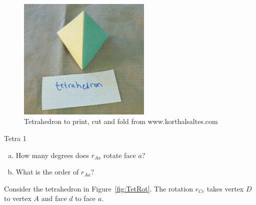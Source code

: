 \begin{figure}[ht]
\begin{center}
\includegraphics[width=2.5in]{images/TetrahedronFold.png}
\caption{Tetrahedron to print, cut and fold from www.korthalsaltes.com}
 \label{fig:TetraFold}
\end{center}
\end{figure}

\begin{exercise}{Tetra 1}
\begin{enumerate}[(a)]
\item How many degrees does $ r_{Aa}$ rotate face $a$?
\item What is the order of $r_{Aa}$?
\end{enumerate}

\end{exercise}
Consider the tetrahedron in Figure~\ref{fig:TetRot}.  The rotation $r_{Cc}$ takes vertex $D$ to vertex $A$ and face $d$ to face $a$.  

